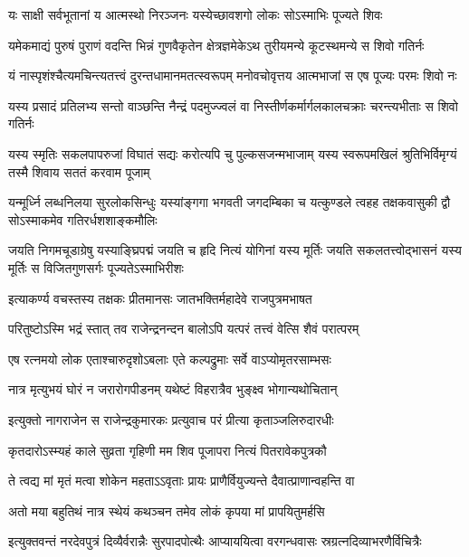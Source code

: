 \twolineshloka
{यः साक्षी सर्वभूतानां य आत्मस्थो निरञ्जनः}
{यस्येच्छावशगो लोकः सोऽस्माभिः पूज्यते शिवः} %

\fourlineindentedshloka
{यमेकमाद्यं पुरुषं पुराणं}
{वदन्ति भिन्नं गुणवैकृतेन}
{क्षेत्रज्ञमेकेऽथ तुरीयमन्ये}
{कूटस्थमन्ये स शिवो गतिर्नः} %

\fourlineindentedshloka
{यं नास्पृशंश्चैत्यमचिन्त्यतत्त्वं}
{दुरन्तधामानमतत्स्वरूपम्}
{मनोवचोवृत्तय आत्मभाजां}
{स एष पूज्यः परमः शिवो नः} %

\fourlineindentedshloka
{यस्य प्रसादं प्रतिलभ्य सन्तो}
{वाञ्छन्ति नैन्द्रं पदमुज्ज्वलं वा}
{निस्तीर्णकर्मार्गलकालचक्राः}
{चरन्त्यभीताः स शिवो गतिर्नः} %

\fourlineindentedshloka
{यस्य स्मृतिः सकलपापरुजां विघातं}
{सद्यः करोत्यपि चु पुल्कसजन्मभाजाम्}
{यस्य स्वरूपमखिलं श्रुतिभिर्विमृग्यं}
{तस्मै शिवाय सततं करवाम पूजाम्} %

\fourlineindentedshloka
{यन्मूर्ध्नि लब्धनिलया सुरलोकसिन्धुः}
{यस्यांङ्गगा भगवती जगदम्बिका च}
{यत्कुण्डले त्वहह तक्षकवासुकी द्वौ}
{सोऽस्माकमेव गतिरर्धशशाङ्कमौलिः} %

\fourlineindentedshloka
{जयति निगमचूडाग्रेषु यस्याङ्घ्रिपद्मं}
{जयति च हृदि नित्यं योगिनां यस्य मूर्तिः}
{जयति सकलतत्त्वोद्भासनं यस्य मूर्तिः}
{स विजितगुणसर्गः पूज्यतेऽस्माभिरीशः} %

\twolineshloka
{इत्याकर्ण्य वचस्तस्य तक्षकः प्रीतमानसः}
{जातभक्तिर्महादेवे राजपुत्रमभाषत} %

\twolineshloka
{परितुष्टोऽस्मि भद्रं स्तात् तव राजेन्द्रनन्दन}
{बालोऽपि यत्परं तत्त्वं वेत्सि शैवं परात्परम्} %

\twolineshloka
{एष रत्नमयो लोक एताश्चारुदृशोऽबलाः}
{एते कल्पद्रुमाः सर्वे वाऽप्योमृतरसाम्भसः} %

\twolineshloka
{नात्र मृत्युभयं घोरं न जरारोगपीडनम्}
{यथेष्टं विहरात्रैव भुङ्क्ष्व भोगान्यथोचितान्} %

\twolineshloka
{इत्युक्तो नागराजेन स राजेन्द्रकुमारकः}
{प्रत्युवाच परं प्रीत्या कृताञ्जलिरुदारधीः} %

\twolineshloka
{कृतदारोऽस्म्यहं काले सुव्रता गृहिणी मम}
{शिव पूजापरा नित्यं पितरावेकपुत्रकौ} %

\twolineshloka
{ते त्वद्य मां मृतं मत्वा शोकेन महताऽऽवृताः}
{प्रायः प्राणैर्वियुज्यन्ते दैवात्प्राणान्वहन्ति वा} %

\twolineshloka
{अतो मया बहुतिथं नात्र स्थेयं कथञ्चन}
{तमेव लोकं कृपया मां प्रापयितुमर्हसि} %

\fourlineindentedshloka
{इत्युक्तवन्तं नरदेवपुत्रं}
{दिव्यैर्वरान्नैः सुरपादपोत्थैः}
{आप्याययित्वा वरगन्धवासः}
{स्रग्रत्नदिव्याभरणैर्विचित्रैः} %

